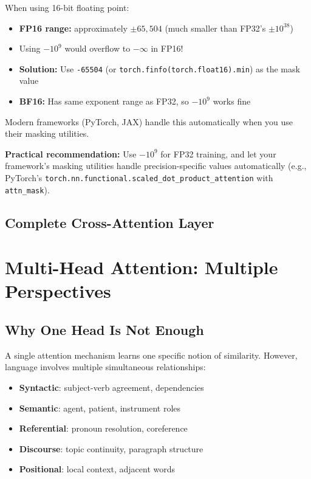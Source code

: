 \documentclass{article}
\begin{document}
\begin{tcolorbox}[colback=yellow!5!white, colframe=orange!50!black, title=Mixed-Precision Training (FP16/BF16)]
When using 16-bit floating point:
\begin{itemize}
    \item \textbf{FP16 range:} approximately $\pm 65,504$ (much smaller than FP32's $\pm 10^{38}$)
    \item Using $-10^9$ would overflow to $-\infty$ in FP16!
    \item \textbf{Solution:} Use \texttt{-65504} (or \texttt{torch.finfo(torch.float16).min}) as the mask value
    \item \textbf{BF16:} Has same exponent range as FP32, so $-10^9$ works fine
\end{itemize}

Modern frameworks (PyTorch, JAX) handle this automatically when you use their masking utilities.
\end{tcolorbox}

\textbf{Practical recommendation:}
Use $-10^9$ for FP32 training, and let your framework's masking utilities handle precision-specific values automatically (e.g., PyTorch's \texttt{torch.nn.functional.scaled\_dot\_product\_attention} with \texttt{attn\_mask}).
\subsection{Complete Cross-Attention Layer}


\section{Multi-Head Attention: Multiple Perspectives}

\subsection{Why One Head Is Not Enough}

A single attention mechanism learns one specific notion of similarity. However, language involves multiple simultaneous relationships:

\begin{itemize}
    \item \textbf{Syntactic}: subject-verb agreement, dependencies
    \item \textbf{Semantic}: agent, patient, instrument roles
    \item \textbf{Referential}: pronoun resolution, coreference
    \item \textbf{Discourse}: topic continuity, paragraph structure
    \item \textbf{Positional}: local context, adjacent words
\end{itemize}
\end{document}
